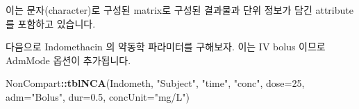 \documentclass[12pt,]{krantz}
\newenvironment{Shaded}{\begin{snugshade}}{\end{snugshade}}
\newcommand{\KeywordTok}[1]{\textcolor[rgb]{0.13,0.29,0.53}{\textbf{#1}}}
\newcommand{\DataTypeTok}[1]{\textcolor[rgb]{0.13,0.29,0.53}{#1}}
\newcommand{\DecValTok}[1]{\textcolor[rgb]{0.00,0.00,0.81}{#1}}
\newcommand{\FloatTok}[1]{\textcolor[rgb]{0.00,0.00,0.81}{#1}}
\newcommand{\StringTok}[1]{\textcolor[rgb]{0.31,0.60,0.02}{#1}}
\newcommand{\OperatorTok}[1]{\textcolor[rgb]{0.81,0.36,0.00}{\textbf{#1}}}
\newcommand{\NormalTok}[1]{#1}
\theoremstyle{definition}
\theoremstyle{definition}
\theoremstyle{definition}
\theoremstyle{remark}
\begin{document}
이는 문자(character)로 구성된 matrix로 구성된 결과물과 단위 정보가 담긴
attribute를 포함하고 있습니다.

다음으로 Indomethacin 의 약동학 파라미터를 구해보자. 이는 IV bolus
이므로 AdmMode 옵션이 추가됩니다.

\begin{Shaded}
\begin{Highlighting}[]
\NormalTok{NonCompart}\OperatorTok{::}\KeywordTok{tblNCA}\NormalTok{(Indometh, }\StringTok{"Subject"}\NormalTok{, }\StringTok{"time"}\NormalTok{, }\StringTok{"conc"}\NormalTok{, }\DataTypeTok{dose=}\DecValTok{25}\NormalTok{, }\DataTypeTok{adm=}\StringTok{"Bolus"}\NormalTok{, }\DataTypeTok{dur=}\FloatTok{0.5}\NormalTok{, }\DataTypeTok{concUnit=}\StringTok{"mg/L"}\NormalTok{)}
\end{Highlighting}
\end{Shaded}
\end{document}
